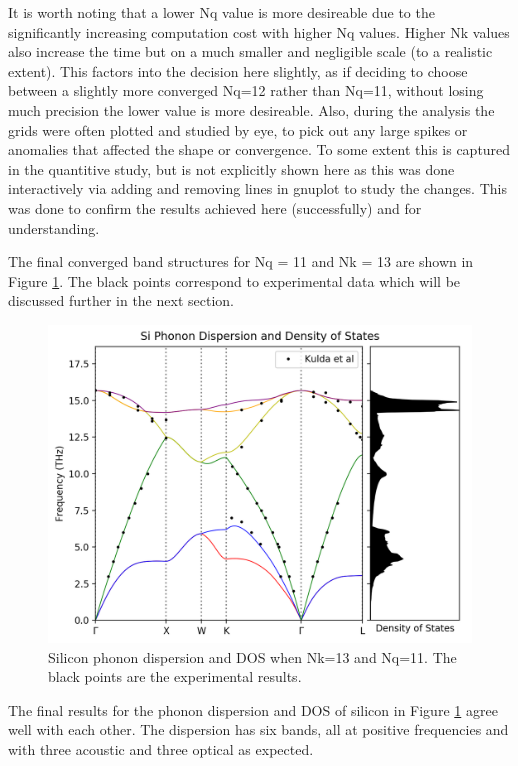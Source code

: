 \documentclass[12pt]{article}
\begin{document}
\bigskip

\noindent It is worth noting that a lower Nq value is more desireable due to the significantly increasing computation cost with higher Nq values. Higher Nk values also increase the time but on a much smaller and negligible scale (to a realistic extent). This factors into the decision here slightly, as if deciding to choose between a slightly more converged Nq=12 rather than Nq=11, without losing much precision the lower value is more desireable. Also, during the analysis the grids were often plotted and studied by eye, to pick out any large spikes or anomalies that affected the shape or convergence. To some extent this is captured in the quantitive study, but is not explicitly shown here as this was done interactively via adding and removing lines in gnuplot to study the changes. This was done to confirm the results achieved here (successfully) and for understanding.

\bigskip

\noindent The final converged band structures for Nq = 11 and Nk = 13 are shown in Figure \ref{fig:band-dos}. The black points correspond to experimental data which will be discussed further in the next section.

\begin{figure}[!htpb]
	\centering
	\includegraphics[width=12cm]{../Figures/si_disp_dos.png}
	\caption{Silicon phonon dispersion and DOS when Nk=13 and Nq=11. The black points are the experimental results\cite{Kulda}. }
	\label{fig:band-dos}
\end{figure}

\bigskip

\noindent The final results for the phonon dispersion and DOS of silicon in Figure \ref{fig:band-dos} agree well with each other. The dispersion has six bands, all at positive frequencies and with three acoustic and three optical as expected.
\end{document}
